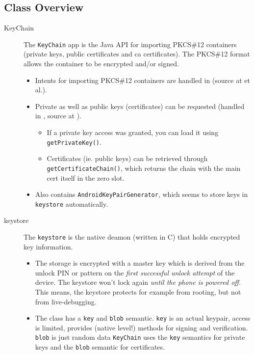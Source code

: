 \documentclass[a4paper]{scrartcl}
\begin{document}
	\subsection{Class Overview}
		\begin{description}
			\item[KeyChain] The \texttt{KeyChain} app is the Java API for importing PKCS\#12 containers (private keys, public certificates and ca certificates). The PKCS\#12 format allows the container to be encrypted and/or signed.
				\begin{itemize}
					\item Intents for importing PKCS\#12 containers are handled in  (source at  et al.).
					\item Private as well as public keys (certificates) can be requested (handled in , source at ).
					\begin{itemize}
						\item If a private key access was granted, you can load it using \texttt{getPrivate\-Key()}.
						\item Certificates (ie. public keys) can be retrieved through \texttt{getCertificate\-Chain()}, which returns the chain with the main cert itself in the zero slot.
					\end{itemize}
				\item Also contains \texttt{AndroidKeyPairGenerator}, which seems to store keys in \texttt{key\-store} automatically. %
				\end{itemize}
			\item[keystore] The \texttt{keystore} is the native deamon (written in C) that holds encrypted key information.
				\begin{itemize}
					\item The storage is encrypted with a master key which is derived from the unlock PIN or pattern on the \emph{first successful unlock attempt} of the device. The keystore won't lock again \emph{until the phone is powered off}. This means, the keystore protects for example from rooting, but not from live-debugging.
					\item The class has a \texttt{key} and \texttt{blob} semantic. \texttt{key} is an actual keypair, access is limited, provides (native level!) methods for signing and verification. \texttt{blob} is just random data \texttt{KeyChain} uses the \texttt{key} semantics for private keys and the \texttt{blob} semantic for certificates. %

\end{itemize}
\end{description}
\end{document}
